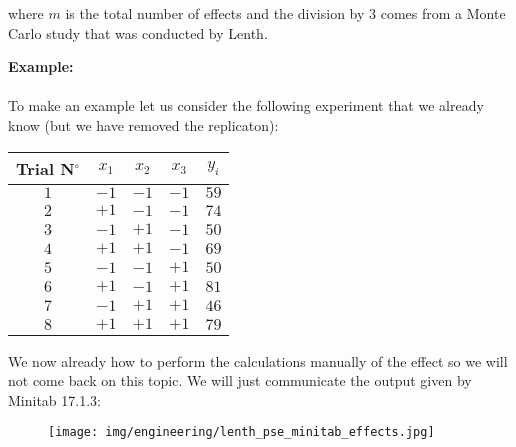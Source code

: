 	where $m$ is the total number of effects and the division by $3$ comes from a Monte Carlo study that was conducted by Lenth.
	\begin{tcolorbox}[colframe=black,colback=white,sharp corners]
	\textbf{{\Large {}}Example:}\\\\
	To make an example let us consider the following experiment that we already know (but we have removed the replicaton):
	\begin{table}[H]\centering
	\begin{center}
			\begin{tabular}{|c|c|c|c|c|}
				\hline
				\multicolumn{1}{c}{\cellcolor{black!30}\textbf{Trial N${}^\circ$}} & 
  \multicolumn{1}{c}{\cellcolor{black!30}$x_1$} & 
  \multicolumn{1}{c}{\cellcolor{black!30}$x_2$} & 
  \multicolumn{1}{c}{\cellcolor{black!30}$x_3$} & 
  \multicolumn{1}{c}{\cellcolor{black!30}$y_{i}$}\\ \hline
				 $1$ & $-1$ & $-1$ & $-1$ & $59$\\ \hline
				 $2$ & $+1$ & $-1$ & $-1$ & $74$\\ \hline
				 $3$ & $-1$ & $+1$ & $-1$ & $50$\\ \hline
				 $4$ & $+1$ & $+1$ & $-1$ & $69$\\ \hline
				 $5$ & $-1$ & $-1$ & $+1$ & $50$\\ \hline
				 $6$ & $+1$ & $-1$ & $+1$ & $81$\\ \hline
				 $7$ & $-1$ & $+1$ & $+1$ & $46$\\ \hline
				 $8$ & $+1$ & $+1$ & $+1$ & $79$\\ \hline
		\end{tabular}
	\end{center}
	\end{table}
	We now already how to perform the calculations manually of the effect so we will not come back on this topic. We will just communicate the output given by Minitab 17.1.3:
	\begin{figure}[H]
		\centering
		\texttt{[image: img/engineering/lenth\_pse\_minitab\_effects.jpg]}	
	\end{figure}
	\end{tcolorbox}
